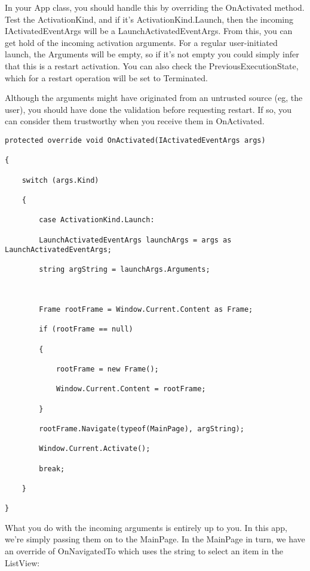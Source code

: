 In your App class, you should handle this by overriding the OnActivated method. Test the ActivationKind, and if it’s ActivationKind.Launch, then the incoming IActivatedEventArgs will be a LaunchActivatedEventArgs. From this, you can get hold of the incoming activation arguments. For a regular user-initiated launch, the Arguments will be empty, so if it’s not empty you could simply infer that this is a restart activation. You can also check the PreviousExecutionState, which for a restart operation will be set to Terminated.

Although the arguments might have originated from an untrusted source (eg, the user), you should have done the validation before requesting restart. If so, you can consider them trustworthy when you receive them in OnActivated.



\begin{lstlisting}[style=CSharpStyle]
protected override void OnActivated(IActivatedEventArgs args)

{
	
	switch (args.Kind)
	
	{
		
		case ActivationKind.Launch:
		
		LaunchActivatedEventArgs launchArgs = args as LaunchActivatedEventArgs;
		
		string argString = launchArgs.Arguments;
		
		
		
		Frame rootFrame = Window.Current.Content as Frame;
		
		if (rootFrame == null)
		
		{
			
			rootFrame = new Frame();
			
			Window.Current.Content = rootFrame;
			
		}
		
		rootFrame.Navigate(typeof(MainPage), argString);
		
		Window.Current.Activate();
		
		break;
		
	}
	
}
\end{lstlisting}


What you do with the incoming arguments is entirely up to you. In this app, we’re simply passing them on to the MainPage. In the MainPage in turn, we have an override of OnNavigatedTo which uses the string to select an item in the ListView:



